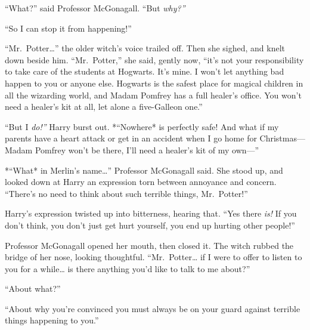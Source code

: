 ``What?'' said Professor McGonagall. ``But \emph{why?''}

``So I can stop it from happening!''

``Mr.~Potter\ldots{}'' the older witch's voice trailed off. Then she
sighed, and knelt down beside him. ``Mr.~Potter,'' she said, gently now,
``it's not your responsibility to take care of the students at Hogwarts.
It's mine. I won't let anything bad happen to you or anyone else.
Hogwarts is the safest place for magical children in all the wizarding
world, and Madam Pomfrey has a full healer's office. You won't need a
healer's kit at all, let alone a five-Galleon one.''

``But I \emph{do!''} Harry burst out. *``Nowhere* is perfectly safe! And
what if my parents have a heart attack or get in an accident when I go
home for Christmas---Madam Pomfrey won't be there, I'll need a healer's
kit of my own---''

*``What* in Merlin's name\ldots{}'' Professor McGonagall said. She stood
up, and looked down at Harry an expression torn between annoyance and
concern. ``There's no need to think about such terrible things,
Mr.~Potter!''

Harry's expression twisted up into bitterness, hearing that. ``Yes there
\emph{is!} If you don't think, you don't just get hurt yourself, you end
up hurting other people!''

Professor McGonagall opened her mouth, then closed it. The witch rubbed
the bridge of her nose, looking thoughtful. ``Mr.~Potter\ldots{} if I
were to offer to listen to you for a while\ldots{} is there anything
you'd like to talk to me about?''

``About what?''

``About why you're convinced you must always be on your guard against
terrible things happening to you.''

